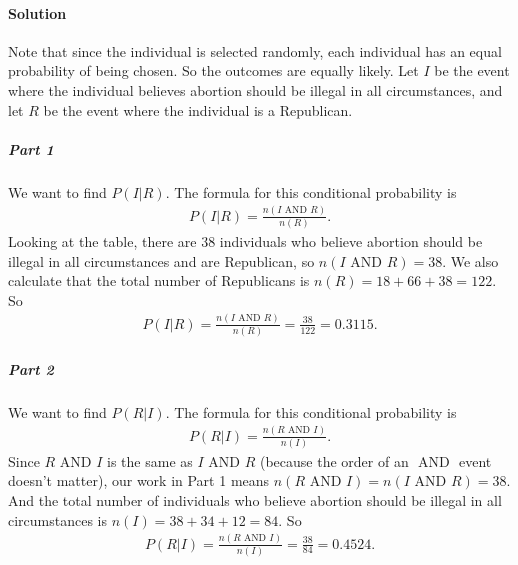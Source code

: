 \documentclass[letterpaper,10pt,english]{jupyterBook}
\begin{document}
\paragraph{Solution}
\label{\detokenize{Ch3 Probability/3.2 Conditional Probability:id2}}
\sphinxAtStartPar
Note that since the individual is selected randomly, each individual has an equal probability of being chosen. So the outcomes are equally likely. Let \(I\) be the event where the individual believes abortion should be illegal in all circumstances, and let \(R\) be the event where the individual is a Republican.


\subparagraph{Part 1}
\label{\detokenize{Ch3 Probability/3.2 Conditional Probability:id3}}
\sphinxAtStartPar
We want to find \(P(I|R)\). The formula for this conditional probability is
\begin{equation*}
\begin{split} P(I|R) = \frac{n(I\text{ AND } R)}{n(R)}. \end{split}
\end{equation*}
\sphinxAtStartPar
Looking at the table, there are \(38\) individuals who believe abortion should be illegal in all circumstances and are Republican, so \(n(I \text{ AND } R) = 38\). We also calculate that the total number of Republicans is \(n(R) = 18 + 66 + 38 = 122\). So
\begin{equation*}
\begin{split} P(I|R) = \frac{n(I\text{ AND } R)}{n(R)} = \frac{38}{122} = 0.3115. \end{split}
\end{equation*}

\subparagraph{Part 2}
\label{\detokenize{Ch3 Probability/3.2 Conditional Probability:id4}}
\sphinxAtStartPar
We want to find \(P(R|I)\). The formula for this conditional probability is
\begin{equation*}
\begin{split}P(R|I) = \frac{n(R \text{ AND } I)}{n(I)}. \end{split}
\end{equation*}
\sphinxAtStartPar
Since \(R \text{ AND } I\) is the same as \(I \text{ AND } R\) (because the order of an \(\text{ AND }\) event doesn’t matter), our work in Part 1 means \(n(R \text{ AND } I) = n(I \text{ AND } R) = 38\). And the total number of individuals who believe abortion should be illegal in all circumstances is \(n(I) = 38 + 34 + 12 = 84\). So
\begin{equation*}
\begin{split} P(R|I) = \frac{n(R \text{ AND } I)}{n(I)} = \frac{38}{84} = 0.4524. \end{split}
\end{equation*}
\end{document}
